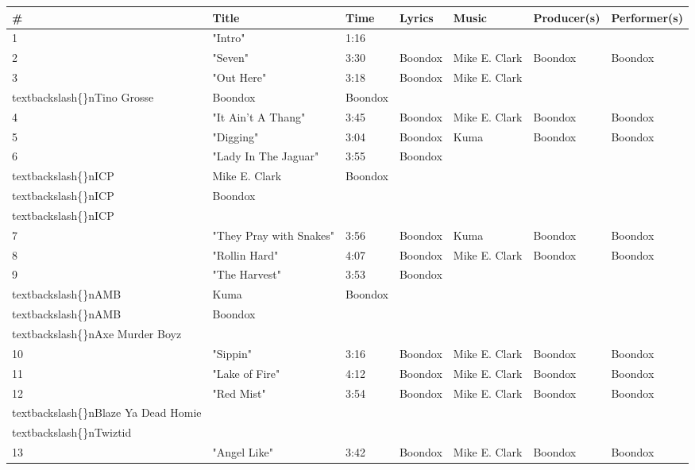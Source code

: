 \documentclass{article}
\begin{document}
\begin{tabular}{lllllll}
\toprule
\# & Title & Time & Lyrics & Music & Producer(s) & Performer(s) \\
\midrule
1 & "Intro" & 1:16 &  &  &  &  \\
2 & "Seven" & 3:30 & Boondox & Mike E. Clark & Boondox & Boondox \\
3 & "Out Here" & 3:18 & Boondox & Mike E. Clark\\textbackslash\{\}nTino Grosse & Boondox & Boondox \\
4 & "It Ain't A Thang" & 3:45 & Boondox & Mike E. Clark & Boondox & Boondox \\
5 & "Digging" & 3:04 & Boondox & Kuma & Boondox & Boondox \\
6 & "Lady In The Jaguar" & 3:55 & Boondox\\textbackslash\{\}nICP & Mike E. Clark & Boondox\\textbackslash\{\}nICP & Boondox\\textbackslash\{\}nICP \\
7 & "They Pray with Snakes" & 3:56 & Boondox & Kuma & Boondox & Boondox \\
8 & "Rollin Hard" & 4:07 & Boondox & Mike E. Clark & Boondox & Boondox \\
9 & "The Harvest" & 3:53 & Boondox\\textbackslash\{\}nAMB & Kuma & Boondox\\textbackslash\{\}nAMB & Boondox\\textbackslash\{\}nAxe Murder Boyz \\
10 & "Sippin" & 3:16 & Boondox & Mike E. Clark & Boondox & Boondox \\
11 & "Lake of Fire" & 4:12 & Boondox & Mike E. Clark & Boondox & Boondox \\
12 & "Red Mist" & 3:54 & Boondox & Mike E. Clark & Boondox & Boondox\\textbackslash\{\}nBlaze Ya Dead Homie\\textbackslash\{\}nTwiztid \\
13 & "Angel Like" & 3:42 & Boondox & Mike E. Clark & Boondox & Boondox \\
\bottomrule
\end{tabular}
\end{document}
